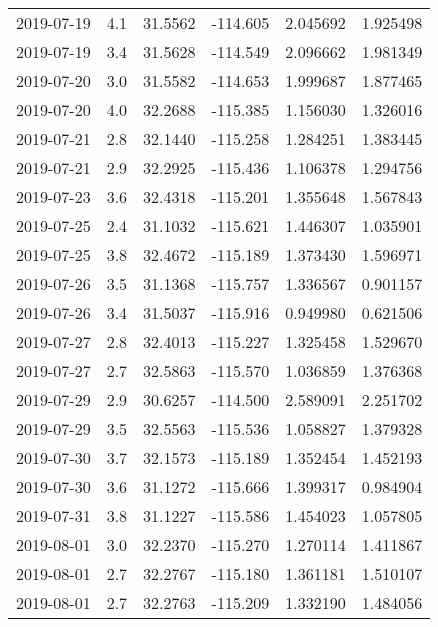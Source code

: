 \begin{tabular}{lrrrrr}
2019-07-19 &       4.1 &  31.5562 &  -114.605 &         2.045692 &         1.925498 \\
2019-07-19 &       3.4 &  31.5628 &  -114.549 &         2.096662 &         1.981349 \\
2019-07-20 &       3.0 &  31.5582 &  -114.653 &         1.999687 &         1.877465 \\
2019-07-20 &       4.0 &  32.2688 &  -115.385 &         1.156030 &         1.326016 \\
2019-07-21 &       2.8 &  32.1440 &  -115.258 &         1.284251 &         1.383445 \\
2019-07-21 &       2.9 &  32.2925 &  -115.436 &         1.106378 &         1.294756 \\
2019-07-23 &       3.6 &  32.4318 &  -115.201 &         1.355648 &         1.567843 \\
2019-07-25 &       2.4 &  31.1032 &  -115.621 &         1.446307 &         1.035901 \\
2019-07-25 &       3.8 &  32.4672 &  -115.189 &         1.373430 &         1.596971 \\
2019-07-26 &       3.5 &  31.1368 &  -115.757 &         1.336567 &         0.901157 \\
2019-07-26 &       3.4 &  31.5037 &  -115.916 &         0.949980 &         0.621506 \\
2019-07-27 &       2.8 &  32.4013 &  -115.227 &         1.325458 &         1.529670 \\
2019-07-27 &       2.7 &  32.5863 &  -115.570 &         1.036859 &         1.376368 \\
2019-07-29 &       2.9 &  30.6257 &  -114.500 &         2.589091 &         2.251702 \\
2019-07-29 &       3.5 &  32.5563 &  -115.536 &         1.058827 &         1.379328 \\
2019-07-30 &       3.7 &  32.1573 &  -115.189 &         1.352454 &         1.452193 \\
2019-07-30 &       3.6 &  31.1272 &  -115.666 &         1.399317 &         0.984904 \\
2019-07-31 &       3.8 &  31.1227 &  -115.586 &         1.454023 &         1.057805 \\
2019-08-01 &       3.0 &  32.2370 &  -115.270 &         1.270114 &         1.411867 \\
2019-08-01 &       2.7 &  32.2767 &  -115.180 &         1.361181 &         1.510107 \\
2019-08-01 &       2.7 &  32.2763 &  -115.209 &         1.332190 &         1.484056 \\

\end{tabular}

